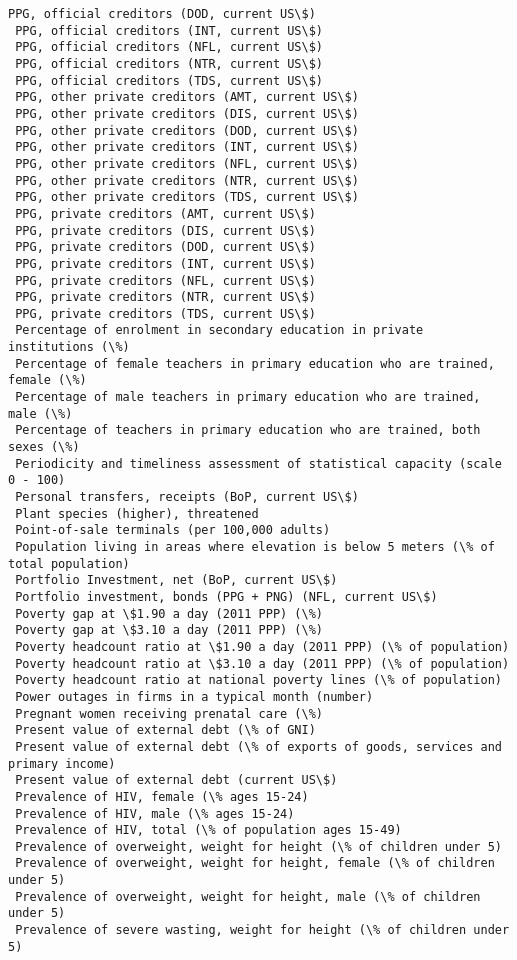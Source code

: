 \documentclass[11pt]{article}
\begin{document}
\begin{Verbatim}[commandchars=\\\{\}]
 PPG, official creditors (DOD, current US\$)
 PPG, official creditors (INT, current US\$)
 PPG, official creditors (NFL, current US\$)
 PPG, official creditors (NTR, current US\$)
 PPG, official creditors (TDS, current US\$)
 PPG, other private creditors (AMT, current US\$)
 PPG, other private creditors (DIS, current US\$)
 PPG, other private creditors (DOD, current US\$)
 PPG, other private creditors (INT, current US\$)
 PPG, other private creditors (NFL, current US\$)
 PPG, other private creditors (NTR, current US\$)
 PPG, other private creditors (TDS, current US\$)
 PPG, private creditors (AMT, current US\$)
 PPG, private creditors (DIS, current US\$)
 PPG, private creditors (DOD, current US\$)
 PPG, private creditors (INT, current US\$)
 PPG, private creditors (NFL, current US\$)
 PPG, private creditors (NTR, current US\$)
 PPG, private creditors (TDS, current US\$)
 Percentage of enrolment in secondary education in private institutions (\%)
 Percentage of female teachers in primary education who are trained, female (\%)
 Percentage of male teachers in primary education who are trained, male (\%)
 Percentage of teachers in primary education who are trained, both sexes (\%)
 Periodicity and timeliness assessment of statistical capacity (scale 0 - 100)
 Personal transfers, receipts (BoP, current US\$)
 Plant species (higher), threatened
 Point-of-sale terminals (per 100,000 adults)
 Population living in areas where elevation is below 5 meters (\% of total population)
 Portfolio Investment, net (BoP, current US\$)
 Portfolio investment, bonds (PPG + PNG) (NFL, current US\$)
 Poverty gap at \$1.90 a day (2011 PPP) (\%)
 Poverty gap at \$3.10 a day (2011 PPP) (\%)
 Poverty headcount ratio at \$1.90 a day (2011 PPP) (\% of population)
 Poverty headcount ratio at \$3.10 a day (2011 PPP) (\% of population)
 Poverty headcount ratio at national poverty lines (\% of population)
 Power outages in firms in a typical month (number)
 Pregnant women receiving prenatal care (\%)
 Present value of external debt (\% of GNI)
 Present value of external debt (\% of exports of goods, services and primary income)
 Present value of external debt (current US\$)
 Prevalence of HIV, female (\% ages 15-24)
 Prevalence of HIV, male (\% ages 15-24)
 Prevalence of HIV, total (\% of population ages 15-49)
 Prevalence of overweight, weight for height (\% of children under 5)
 Prevalence of overweight, weight for height, female (\% of children under 5)
 Prevalence of overweight, weight for height, male (\% of children under 5)
 Prevalence of severe wasting, weight for height (\% of children under 5)

\end{Verbatim}
\end{document}
